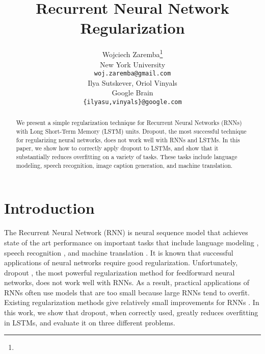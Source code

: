 \documentclass{article}
\title{Recurrent Neural Network Regularization}
\begin{document}
 




\author{
Wojciech Zaremba\footnote{} \\
New York University\\
\texttt{woj.zaremba@gmail.com} \\
\And
Ilya Sutskever, Oriol Vinyals \\
Google Brain \\
\texttt{\{ilyasu,vinyals\}@google.com} \\
}

\maketitle

\begin{abstract} 
  We present a simple regularization technique for Recurrent Neural
  Networks (RNNs) with Long Short-Term Memory (LSTM) units.  Dropout,
  the most successful technique for regularizing neural networks, does
  not work well with RNNs and LSTMs.  In this paper, we show how to
  correctly apply dropout to LSTMs, and show that it
  substantially reduces overfitting on a variety of tasks. These tasks
  include language modeling, speech recognition, image caption generation, and machine
  translation.
\end{abstract} 

{\textcolor{white} {\fontsize{0.001cm}{0.01em}\selectfont \footnotemark{} }}

\section{Introduction}

The Recurrent Neural Network (RNN) is neural sequence model that achieves state of the art
performance on important tasks that include language modeling
\cite{mikolov2012statistical}, speech recognition
\cite{graves2013speech}, and machine translation
\cite{kal13}.  It is known that successful applications of
neural networks require good regularization. Unfortunately, dropout
\cite{srivastava2013improving}, the most powerful regularization method
for feedforward neural networks, does not work well with
RNNs. As a result, practical applications of RNNs often
use models that are too small because large RNNs tend to overfit.  
Existing regularization methods give relatively small improvements for
RNNs \cite{graves2013generating}.
In this work, we show that dropout, when correctly used,
greatly reduces overfitting in LSTMs, and evaluate it on three different problems.
\end{document}
